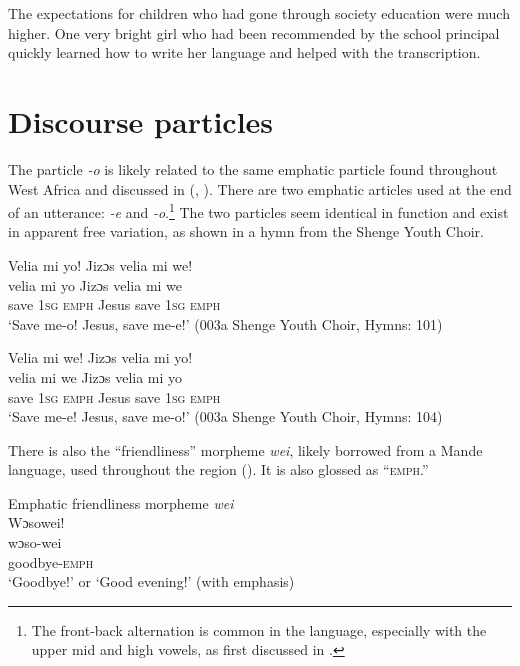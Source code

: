 The expectations for children who had gone through society education were much higher. One very bright girl who had been recommended by the school principal quickly learned how to write her language and helped with the transcription.

\section{Discourse particles}
\label{sec:10.1}\hypertarget{Toc115517824}{}
\-The particle \textit{{}-o} is likely related to the same emphatic particle found throughout West Africa and discussed in  (\citealt{Childs1995}, \citealt{Singler1988b}). There are two emphatic articles used at the end of an utterance: \textit{{}-e} and \textit{{}-o}.\footnote{The front-back alternation is common in the language, especially with the upper mid and high vowels, as first discussed in .} The two particles seem identical in function and exist in apparent free variation, as shown in a hymn from the Shenge Youth Choir.

\ea%
    \label{ex:242}
      \ea  Velia mi yo! Jizɔs velia mi we!\\
      \gll velia  mi    yo      Jizɔs    velia  mi    we\\
      save  \textsc{1sg}  \textsc{emph}    Jesus    save  \textsc{1sg}  \textsc{emph}\\
      \glt ‘Save me-o! Jesus, save me-e!' (003a Shenge Youth Choir, Hymns: 101)

      \ex Velia mi we! Jizɔs velia mi yo!\\
      \gll velia  mi    we      Jizɔs    velia  mi    yo\\
      save  \textsc{1sg}  \textsc{emph}    Jesus    save  \textsc{1sg}  \textsc{emph}\\
      \glt ‘Save me-e! Jesus, save me-o!' (003a Shenge Youth Choir, Hymns: 104)
\z
\z

There is also the “friendliness” morpheme \textit{wei}, likely borrowed from a Mande language, used throughout the region (\citealt{Childs2011}). It is also glossed as “\textsc{emph}.”

\ea%
    \label{ex:243}
    Emphatic friendliness morpheme \textit{wei}\\
   \ea Wɔsowei!\\
   \gll wɔso-wei\\
   goodbye-\textsc{emph}\\
 \glt ‘Goodbye!' or ‘Good evening!' (with emphasis)\\
      
